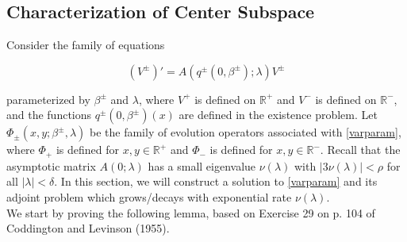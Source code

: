 \documentclass[12pt]{article}
\def\R{{\mathbb R}}
\begin{document}
\subsection{Characterization of Center Subspace}

Consider the family of equations

\begin{equation}\label{varparam}
(V^\pm)' = A(q^\pm(0, \beta^\pm); \lambda) V^\pm
\end{equation}

parameterized by $\beta^\pm$ and $\lambda$, where $V^+$ is defined on $\R^+$ and $V^-$ is defined on $\R^-$, and the functions $q^\pm(0, \beta^\pm)(x)$ are defined in the existence problem. Let $\Phi_\pm(x, y; \beta^\pm, \lambda)$ be the family of evolution operators associated with \eqref{varparam}, where $\Phi_+$ is defined for $x, y \in \R^+$ and $\Phi_-$ is defined for $x, y \in \R^-$. Recall that the asymptotic matrix $A(0; \lambda)$ has a small eigenvalue $\nu(\lambda)$ with $|3 \nu(\lambda)| < \rho$ for all $|\lambda| < \delta$. In this section, we will construct a solution to \eqref{varparam} and its adjoint problem which grows/decays with exponential rate $\nu(\lambda)$.\\

We start by proving the following lemma, based on Exercise 29 on p. 104 of Coddington and Levinson (1955).

\end{document}
